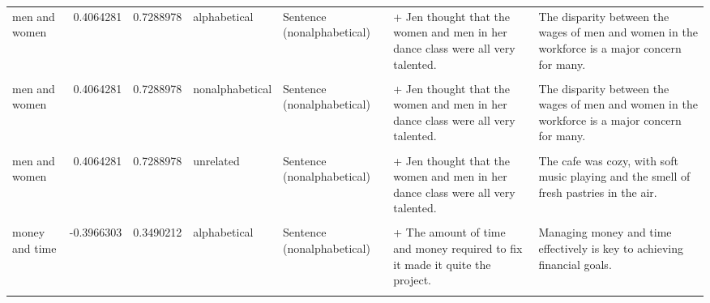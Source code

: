 \documentclass[
  12pt,
]{scrartcl}
\begin{document}
\begin{landscape}
\begin{longtable}{lrrllll}
\addlinespace
men and women & 0.4064281 & 0.7288978 & alphabetical & Sentence (nonalphabetical) & + Jen thought that the women and men in her dance class were all very talented. & The disparity between the wages of men and women in the workforce is a major concern for many.\\
\cellcolor{gray!6}{men and women} & \cellcolor{gray!6}{0.4064281} & \cellcolor{gray!6}{0.7288978} & \cellcolor{gray!6}{nonalphabetical} & \cellcolor{gray!6}{Sentence (alphabetical)} & \cellcolor{gray!6}{+ Jen thought that the men and women in her dance class were all very talented.} & \cellcolor{gray!6}{The disparity between the wages of men and women in the workforce is a major concern for many.}\\
men and women & 0.4064281 & 0.7288978 & nonalphabetical & Sentence (nonalphabetical) & + Jen thought that the women and men in her dance class were all very talented. & The disparity between the wages of men and women in the workforce is a major concern for many.\\
\cellcolor{gray!6}{men and women} & \cellcolor{gray!6}{0.4064281} & \cellcolor{gray!6}{0.7288978} & \cellcolor{gray!6}{unrelated} & \cellcolor{gray!6}{Sentence (alphabetical)} & \cellcolor{gray!6}{+ Jen thought that the men and women in her dance class were all very talented.} & \cellcolor{gray!6}{The cafe was cozy, with soft music playing and the smell of fresh pastries in the air.}\\
men and women & 0.4064281 & 0.7288978 & unrelated & Sentence (nonalphabetical) & + Jen thought that the women and men in her dance class were all very talented. & The cafe was cozy, with soft music playing and the smell of fresh pastries in the air.\\
\addlinespace
\cellcolor{gray!6}{money and time} & \cellcolor{gray!6}{-0.3966303} & \cellcolor{gray!6}{0.3490212} & \cellcolor{gray!6}{alphabetical} & \cellcolor{gray!6}{Sentence (alphabetical)} & \cellcolor{gray!6}{+ The amount of money and time required to fix it made it quite the project.} & \cellcolor{gray!6}{Managing money and time effectively is key to achieving financial goals.}\\
money and time & -0.3966303 & 0.3490212 & alphabetical & Sentence (nonalphabetical) & + The amount of time and money required to fix it made it quite the project. & Managing money and time effectively is key to achieving financial goals.\\
\cellcolor{gray!6}{money and time} & \cellcolor{gray!6}{-0.3966303} & \cellcolor{gray!6}{0.3490212} & \cellcolor{gray!6}{nonalphabetical} & \cellcolor{gray!6}{Sentence (alphabetical)} & \cellcolor{gray!6}{+ The amount of money and time required to fix it made it quite the project.} & \cellcolor{gray!6}{Managing time and money effectively is key to achieving financial goals.}\\

\end{longtable}
\end{landscape}
\end{document}

